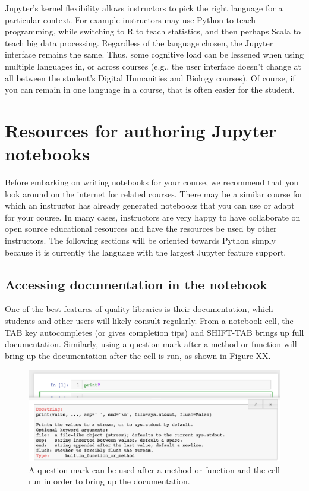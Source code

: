 \documentclass[]{book}
\begin{document}
Jupyter's kernel flexibility allows instructors to pick the right
language for a particular context. For example instructors may use
Python to teach programming, while switching to R to teach statistics,
and then perhaps Scala to teach big data processing. Regardless of the
language chosen, the Jupyter interface remains the same. Thus, some
cognitive load can be lessened when using multiple languages in, or
across courses (e.g., the user interface doesn't change at all between
the student's Digital Humanities and Biology courses). Of course, if you
can remain in one language in a course, that is often easier for the
student.

\section{Resources for authoring Jupyter
notebooks}\label{resources-for-authoring-jupyter-notebooks}

Before embarking on writing notebooks for your course, we recommend that
you look around on the internet for related courses. There may be a
similar course for which an instructor has already generated notebooks
that you can use or adapt for your course. In many cases, instructors
are very happy to have collaborate on open source educational resources
and have the resources be used by other instructors. The following
sections will be oriented towards Python simply because it is currently
the language with the largest Jupyter feature support.

\subsection{Accessing documentation in the
notebook}\label{accessing-documentation-in-the-notebook}

One of the best features of quality libraries is their documentation,
which students and other users will likely consult regularly. From a
notebook cell, the TAB key autocompletes (or gives completion tips) and
SHIFT-TAB brings up full documentation. Similarly, using a question-mark
after a method or function will bring up the documentation after the
cell is run, as shown in Figure XX.

\begin{figure}
\centering
\includegraphics{images/chapter50.png}
\caption{A question mark can be used after a method or function and the
cell run in order to bring up the documentation.}
\end{figure}
\end{document}
